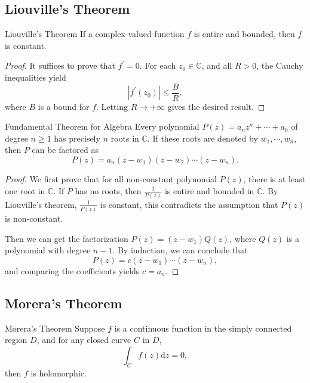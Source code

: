 \subsection{Liouville's Theorem}

\begin{theorem}{Liouville's Theorem}{}
  If a complex-valued function $f$ is entire and bounded, then $f$ is constant.
\end{theorem}

\begin{proof}
  It suffices to prove that $f^{\prime} = 0$.
  For each $z_0 \in \mathbb{C}$, and all $R > 0$, the Cauchy inequalities yield
  \begin{equation}
    |f^{\prime}(z_0)| \leq \frac{B}{R},
  \end{equation}
  where $B$ is a bound for $f$. Letting $R \rightarrow +\infty$ gives the desired result.
\end{proof}

\begin{theorem}{Fundamental Theorem for Algebra}{}
  Every polynomial $P(z) = a_nz^n + \cdots + a_0$ of degree $n \geq 1$
  has precisely $n$ roots in $\mathbb{C}$.
  If these roots are denoted by $w_1,\cdots,w_n$, then $P$ can be factored as
  \begin{equation}
    P(z) = a_n(z-w_1)(z-w_2)\cdots (z-w_n).
  \end{equation}
\end{theorem}

\begin{proof}
  We first prove that for all non-constant polynomial $P(z)$,
  there is at least one root in $\mathbb{C}$.
  If $P$ has no roots, then $\frac{1}{P(z)}$ is entire and bounded in $\mathbb{C}$.
  By Liouville's theorem, $\frac{1}{P(z)}$ is constant,
  this contradicts the assumption that $P(z)$ is non-constant.

  Then we can get the factorization $P(z) = (z-w_1)Q(z)$,
  where $Q(z)$ is a polynomial with degree $n-1$.
  By induction, we can conclude that
  \begin{equation}
    P(z) = c(z-w_1)\cdots (z-w_n),
  \end{equation}
  and comparing the coefficients yields $c = a_n$.
\end{proof}


\subsection{Morera's Theorem}

\begin{theorem}{Morera's Theorem}{}
  Suppose $f$ is a continuous function in the simply connected region $D$,
  and for any closed curve $C$ in $D$,
  \begin{equation}
    \int_C f(z)\mathrm{d} z = 0,
  \end{equation}
  then $f$ is holomorphic.
\end{theorem}


